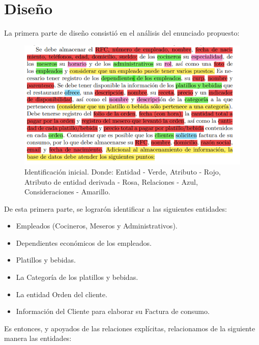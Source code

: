 \documentclass[12pt, letterpaper]{article} %
\begin{document}
\newpage
\section{Diseño}

La primera parte de diseño consistió en el análisis del enunciado propuesto:

\begin{figure}[h]
    \centering
    \includegraphics{Img/Analisis_Inicial.png}
    \caption{Identificación inicial. Donde: Entidad - Verde, Atributo - Rojo, Atributo de entidad derivada - Rosa, Relaciones - Azul, Consideraciones - Amarillo.}
\end{figure}

De esta primera parte, se lograrón identificar a las siguientes entidades:

\begin{itemize}
    \item Empleados (Cocineros, Meseros y Administrativos).
    \item Dependientes económicos de los empleados.
    \item Platillos y bebidas.
    \item La Categoría de los platillos y bebidas.
    \item La entidad Orden del cliente.
    \item Información del Cliente para elaborar su Factura de consumo.
\end{itemize}

Es entonces, y apoyados de las relaciones explícitas, relacionamos de la siguiente manera las entidades:
\end{document}
